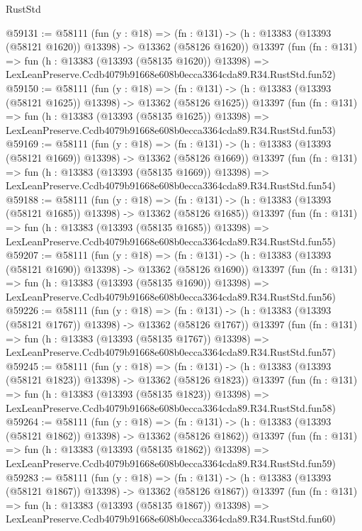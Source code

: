\begin{lexlean}{RustStd}
\begin{coremodule}
@59131 := @58111
    (fun (y : @18) =>
    (fn : @131) -> (h : @13383 (@13393 (@58121 @1620)) @13398) -> @13362 (@58126 @1620))
    @13397
    (fun (fn : @131) =>
    fun (h : @13383 (@13393 (@58135 @1620)) @13398) =>
    LexLeanPreserve.Ccdb4079b91668e608b0ecca3364cda89.R34.RustStd.fun52)
@59150 := @58111
    (fun (y : @18) =>
    (fn : @131) -> (h : @13383 (@13393 (@58121 @1625)) @13398) -> @13362 (@58126 @1625))
    @13397
    (fun (fn : @131) =>
    fun (h : @13383 (@13393 (@58135 @1625)) @13398) =>
    LexLeanPreserve.Ccdb4079b91668e608b0ecca3364cda89.R34.RustStd.fun53)
@59169 := @58111
    (fun (y : @18) =>
    (fn : @131) -> (h : @13383 (@13393 (@58121 @1669)) @13398) -> @13362 (@58126 @1669))
    @13397
    (fun (fn : @131) =>
    fun (h : @13383 (@13393 (@58135 @1669)) @13398) =>
    LexLeanPreserve.Ccdb4079b91668e608b0ecca3364cda89.R34.RustStd.fun54)
@59188 := @58111
    (fun (y : @18) =>
    (fn : @131) -> (h : @13383 (@13393 (@58121 @1685)) @13398) -> @13362 (@58126 @1685))
    @13397
    (fun (fn : @131) =>
    fun (h : @13383 (@13393 (@58135 @1685)) @13398) =>
    LexLeanPreserve.Ccdb4079b91668e608b0ecca3364cda89.R34.RustStd.fun55)
@59207 := @58111
    (fun (y : @18) =>
    (fn : @131) -> (h : @13383 (@13393 (@58121 @1690)) @13398) -> @13362 (@58126 @1690))
    @13397
    (fun (fn : @131) =>
    fun (h : @13383 (@13393 (@58135 @1690)) @13398) =>
    LexLeanPreserve.Ccdb4079b91668e608b0ecca3364cda89.R34.RustStd.fun56)
@59226 := @58111
    (fun (y : @18) =>
    (fn : @131) -> (h : @13383 (@13393 (@58121 @1767)) @13398) -> @13362 (@58126 @1767))
    @13397
    (fun (fn : @131) =>
    fun (h : @13383 (@13393 (@58135 @1767)) @13398) =>
    LexLeanPreserve.Ccdb4079b91668e608b0ecca3364cda89.R34.RustStd.fun57)
@59245 := @58111
    (fun (y : @18) =>
    (fn : @131) -> (h : @13383 (@13393 (@58121 @1823)) @13398) -> @13362 (@58126 @1823))
    @13397
    (fun (fn : @131) =>
    fun (h : @13383 (@13393 (@58135 @1823)) @13398) =>
    LexLeanPreserve.Ccdb4079b91668e608b0ecca3364cda89.R34.RustStd.fun58)
@59264 := @58111
    (fun (y : @18) =>
    (fn : @131) -> (h : @13383 (@13393 (@58121 @1862)) @13398) -> @13362 (@58126 @1862))
    @13397
    (fun (fn : @131) =>
    fun (h : @13383 (@13393 (@58135 @1862)) @13398) =>
    LexLeanPreserve.Ccdb4079b91668e608b0ecca3364cda89.R34.RustStd.fun59)
@59283 := @58111
    (fun (y : @18) =>
    (fn : @131) -> (h : @13383 (@13393 (@58121 @1867)) @13398) -> @13362 (@58126 @1867))
    @13397
    (fun (fn : @131) =>
    fun (h : @13383 (@13393 (@58135 @1867)) @13398) =>
    LexLeanPreserve.Ccdb4079b91668e608b0ecca3364cda89.R34.RustStd.fun60)

\end{coremodule}
\end{lexlean}
